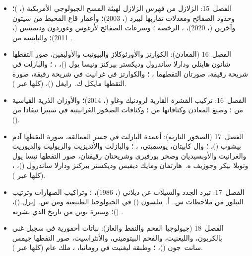 \begin{itemize}
  \item الفصل~15: الزلازل من فهرس الزلازل لهيئة المسح الجيولوجي الأمريكية (، )؛ وحدود الصفائح ومعدلات تقاربها لبيرد (، 2003)؛ وأعمار قاع المحيط من سيتون وآخرين (، 2020)، ، الرخصة ؛ وسرعات الصفائح  لأرغوس وغوردون وديميتس (، 2011)؛ واليابسة من .
  \item الفصل~16 (المعادن): الكوارتز والأورثوكلاز والبيوتيت والأوليفين، صور التقطها شانون هاينلي ودارلا ساندرول وديكستر بيركنز ونيسا يول ()، ، ؛ والبازلت في شريحة رقيقة، صورتان التقطهما ، ؛ والكوارتز في غرانيت في شريحة رقيقة، صورة التقطها مايكل ك.~رايغل ()،  (كلها عبر ).
  \item الفصل~16: تركيب القشرة القارية لرودنيك وغاو (، 2014)؛ والأوزان الذرية القياسية من ؛ وصيغ المعادن وكثافاتها من ؛ وكثافات الصخور الغرانيتية في سييرا نيفادا من  ().
  \item الفصل~17 (الصخور النارية): أعمدة البازلت في جسر العمالقة، صورة التقطها آدم بيشوب ()، ؛ وإل كابيتان، يوسميتي، ، ؛ والبازلت والأنديزيت والريوليت والديوريت والغرانيت والأوبسيديان وصخر بورفيري وشريحتان رقيقتان، صور التقطها نيسا يول وتويلا بيكر وجوزيف ه.~هارتمان ومايك ديفيس وديكستر بيركنز ودارلا ساندرول ()، ،  (كلها عبر ).
  \item الفصل~17: تبرد الجدد والسيلات عن ديلاني (، 1986)، ؛ وتراكيب الصهارات وترتيب التبلور من ملاحظات س.~أ.~نيلسون () في الجيولوجيا الطبيعية ومن س.~إيرل ()،  ()؛ وسيرة بوين من تاريخ  الذي نشرته .
  \item الفصل~18 (جيولوجيا الفحم والنفط والغاز): نباتات أحفورية في سجيل غني بالكربون، والليغنيت، والفحم البيتوميني، والأنثراسيت، صور التقطها جيمس سانت~جون ()، ؛ وطبقة ليغنيت في رومانيا، ، ملك عام (كلها عبر ).

\end{itemize}

